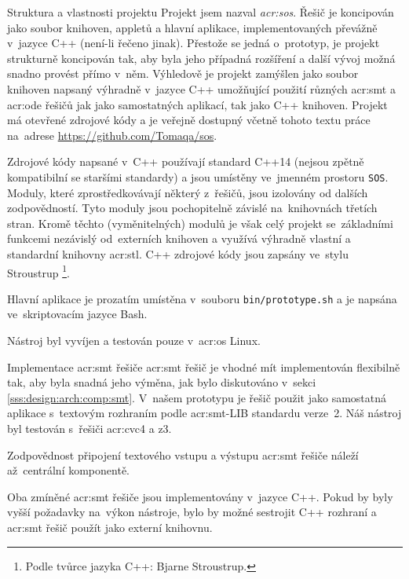 \documentclass[thesis=M,czech]{FITthesis}[2012/06/26]
\newcommand{\acrlabel}[1]{acr:#1}
\newcommand{\acr}[1]{\acrshort{\acrlabel{#1}}}
\newcommand{\acrf}[1]{\acrfull{\acrlabel{#1}}}
\newcommand{\id}[1]{\texttt{#1}}
\newcommand{\hl}[1]{\textit{#1}}
\newcommand{\name}[1]{\hl{#1}}
\newcommand{\rf}[1]{\ref{#1}}
\newcommand{\binDir}{\id{bin}}
\newcommand{\binFn}[1]{\id{\binDir{}/\-#1}}
\begin{document}
\begin{section}{Struktura a vlastnosti projektu}\label{s:impl:proj}
Projekt jsem nazval \name{\acrf{sos}}.
Řešič je koncipován
jako soubor knihoven, appletů a hlavní aplikace,
implementovaných převážně v~jazyce C++ (není-li řečeno jinak).
Přestože se jedná o~prototyp, je projekt strukturně koncipován tak,
aby byla jeho případná rozšíření a další vývoj
možná snadno provést přímo v~něm.
Výhledově je projekt zamýšlen jako soubor knihoven
napsaný výhradně v~jazyce C++
umožňující použití různých \acr{smt} a \acr{ode}
řešičů jak jako samostatných aplikací, tak jako C++ knihoven.
Projekt má otevřené zdrojové kódy
a je veřejně dostupný včetně tohoto textu práce na~adrese
\url{https://github.com/Tomaqa/sos}.

Zdrojové kódy napsané v~C++ používají standard C++14
(nejsou zpětně kompatibilní se staršími standardy)
a jsou umístěny ve~jmenném prostoru \id{SOS}.
Moduly, které zprostředkovávají některý z~řešičů,
jsou izolovány od dalších zodpovědností.
Tyto moduly jsou pochopitelně závislé na~knihovnách třetích stran.
Kromě těchto (vyměnitelných) modulů je však celý projekt
se~základními funkcemi
nezávislý od~externích knihoven a využívá výhradně
vlastní a standardní knihovny \acr{stl}.
C++ zdrojové kódy jsou zapsány ve~stylu Stroustrup%
\footnote{Podle tvůrce jazyka C++: Bjarne Stroustrup.}.

Hlavní aplikace je prozatím umístěna v~souboru \binFn{prototype.sh}
a je napsána ve~skriptovacím jazyce Bash.

Nástroj byl vyvíjen a testován pouze v~\acr{os} Linux.
\end{section} %


\begin{section}{Implementace \acr{smt} řešiče}\label{s:impl:smt}
\acr{smt} řešič je vhodné mít implementován flexibilně tak,
aby byla snadná jeho výměna, jak bylo diskutováno
v~sekci \rf{sss:design:arch:comp:smt}.
V~našem prototypu je řešič použit jako samostatná aplikace
s~textovým rozhraním podle \acr{smt}-LIB standardu verze~2.
Náš nástroj byl testován s~řešiči \acr{cvc}4 a z3.

Zodpovědnost připojení textového vstupu a výstupu \acr{smt} řešiče
náleží až~centrální komponentě.

Oba zmíněné \acr{smt} řešiče jsou implementovány v~jazyce C++.
Pokud by byly vyšší požadavky na~výkon nástroje,
bylo by možné sestrojit C++ rozhraní a \acr{smt} řešič použít
jako externí knihovnu.
\end{section} %
\end{document}
